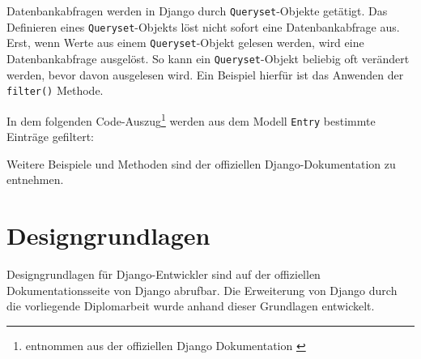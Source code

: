Datenbankabfragen werden in Django durch \texttt{Queryset}-Objekte
getätigt. Das Definieren eines \texttt{Queryset}-Objekts löst nicht
sofort eine Datenbankabfrage aus. Erst, wenn Werte aus einem
\texttt{Queryset}-Objekt gelesen werden, wird eine Datenbankabfrage
ausgelöst. So kann ein \texttt{Queryset}-Objekt beliebig oft verändert
werden, bevor davon ausgelesen wird. Ein Beispiel hierfür ist das
Anwenden der \texttt{filter()} Methode.

In dem folgenden Code-Auszug\footnote{entnommen aus der offiziellen
  Django Dokumentation \cite{django-doku-queries}} werden aus dem Modell
\texttt{Entry} bestimmte Einträge gefiltert:

\begin{Shaded}
\begin{Highlighting}[]
\OperatorTok{=}\OperatorTok{=}\NormalTok{)}

\OperatorTok{=}\OperatorTok{=}

\OperatorTok{=}\OperatorTok{=}\NormalTok{)}

\end{Highlighting}
\end{Shaded}

Weitere Beispiele und Methoden sind der offiziellen Django-Dokumentation
zu entnehmen. \cite{django-doku-queries}

\hypertarget{designgrundlagen}{%
\section{Designgrundlagen}\label{designgrundlagen}}

Designgrundlagen für Django-Entwickler sind auf der offiziellen
Dokumentationsseite von Django abrufbar. \cite{django-doku-coding-style}
Die Erweiterung von Django durch die vorliegende Diplomarbeit wurde
anhand dieser Grundlagen entwickelt.

